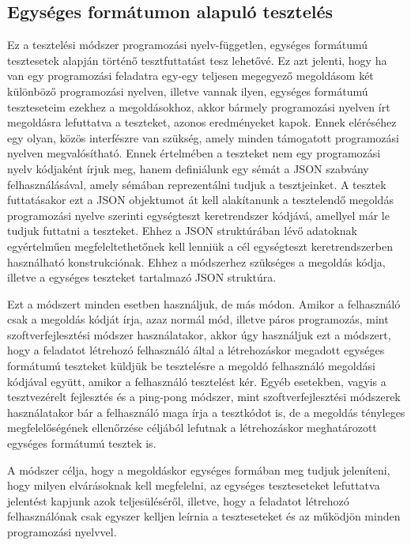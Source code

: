 \documentclass{elteikthesis}
\begin{document}
			\subsection{Egységes formátumon alapuló tesztelés}
				Ez a tesztelési módszer programozási nyelv-független, egységes formátumú tesztesetek alapján történő tesztfuttatást tesz lehetővé. Ez azt jelenti, hogy ha van egy programozási feladatra egy-egy teljesen megegyező megoldásom két különböző programozási nyelven, illetve vannak ilyen, egységes formátumú teszteseteim ezekhez a megoldásokhoz, akkor bármely programozási nyelven írt megoldásra lefuttatva a teszteket, azonos eredményeket kapok. Ennek eléréséhez egy olyan, közös interfészre van szükség, amely minden támogatott programozási nyelven megvalósítható. Ennek értelmében a teszteket nem egy programozási nyelv kódjaként írjuk meg, hanem definiálunk egy sémát a JSON szabvány felhasználásával, amely sémában reprezentálni tudjuk a tesztjeinket. A tesztek futtatásakor ezt a JSON objektumot át kell alakítanunk a tesztelendő megoldás programozási nyelve szerinti egységteszt keretrendszer kódjává, amellyel már le tudjuk futtatni a teszteket. Ehhez a JSON struktúrában lévő adatoknak egyértelműen megfeleltethetőnek kell lenniük a cél egységteszt keretrendszerben használható konstrukciónak. Ehhez a módszerhez szükséges a megoldás kódja, illetve a egységes teszteket tartalmazó JSON struktúra.
				
				Ezt a módszert minden esetben használjuk, de más módon. Amikor a felhasználó csak a megoldás kódját írja, azaz normál mód, illetve páros programozás, mint szoftverfejlesztési módszer használatakor, akkor úgy használjuk ezt a módszert, hogy a feladatot létrehozó felhasználó által a létrehozáskor megadott egységes formátumú teszteket küldjük be tesztelésre a megoldó felhasználó megoldási kódjával együtt, amikor a felhasználó tesztelést kér. Egyéb esetekben, vagyis a tesztvezérelt fejlesztés és a ping-pong módszer, mint szoftverfejlesztési módszerek használatakor bár a felhasználó maga írja a tesztkódot is, de a megoldás tényleges megfelelőségének ellenőrzése céljából lefutnak a létrehozáskor meghatározott egységes formátumú tesztek is.
				
				A módszer célja, hogy a megoldáskor egységes formában meg tudjuk jeleníteni, hogy milyen elvárásoknak kell megfelelni, az egységes teszteseteket lefuttatva jelentést kapjunk azok teljesüléséről, illetve, hogy a feladatot létrehozó felhasználónak csak egyszer kelljen leírnia a teszteseteket és az működjön minden programozási nyelvvel.
\end{document}
